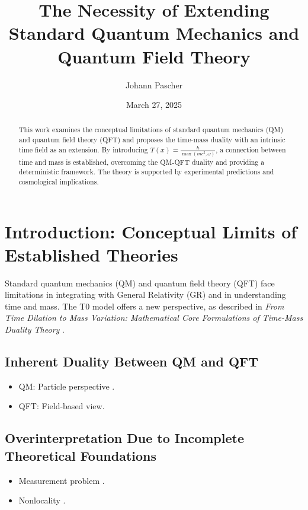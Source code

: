 \documentclass[12pt,a4paper]{article}
\title{The Necessity of Extending Standard Quantum Mechanics and Quantum Field Theory}
\author{Johann Pascher}
\date{March 27, 2025}
\newcommand{\Tfield}{T(x)}
\begin{document}
	
	\maketitle
	
	\begin{abstract}
		This work examines the conceptual limitations of standard quantum mechanics (QM) and quantum field theory (QFT) and proposes the time-mass duality with an intrinsic time field as an extension. By introducing \(\Tfield = \frac{\hbar}{\max(m c^2, \omega)}\), a connection between time and mass is established, overcoming the QM-QFT duality and providing a deterministic framework. The theory is supported by experimental predictions and cosmological implications.
	\end{abstract}
	
	\tableofcontents
	\newpage
	
	\section{Introduction: Conceptual Limits of Established Theories}
	Standard quantum mechanics (QM) and quantum field theory (QFT) face limitations in integrating with General Relativity (GR) and in understanding time and mass. The T0 model offers a new perspective, as described in \textit{From Time Dilation to Mass Variation: Mathematical Core Formulations of Time-Mass Duality Theory} \cite{pascher_lagrange_2025}.
	
	\subsection{Inherent Duality Between QM and QFT}
	\begin{itemize}
		\item QM: Particle perspective \cite{schrodinger}.
		\item QFT: Field-based view.
	\end{itemize}
	
	\subsection{Overinterpretation Due to Incomplete Theoretical Foundations}
	\begin{itemize}
		\item Measurement problem \cite{einstein2}.
		\item Nonlocality \cite{bell}.
	\end{itemize}
	
\end{document}
